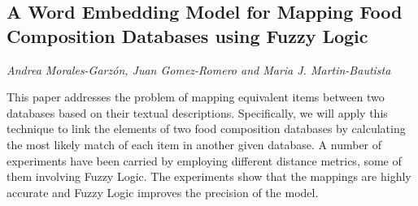 \documentclass[../booklet.tex]{subfiles}
\begin{document}
\subsection[A Word Embedding Model for Mapping Food Composition Databases using Fuzzy Logic. {\it Andrea Morales-Garzón, Juan Gomez-Romero and Maria J. Martin-Bautista}]{A Word Embedding Model for Mapping Food Composition Databases using Fuzzy Logic}
  

\begin{center}
  {\it Andrea Morales-Garzón, Juan Gomez-Romero and Maria J. Martin-Bautista}
\end{center}






This paper addresses the problem of mapping equivalent items between two databases based on their textual descriptions. Specifically, we will apply this technique to link the elements of two food composition databases by calculating the most likely match of each item in another given database. A number of experiments have been carried by employing different distance metrics, some of them involving Fuzzy Logic. The experiments show that the mappings are highly accurate and Fuzzy Logic improves the precision of the model.%


\end{document}
